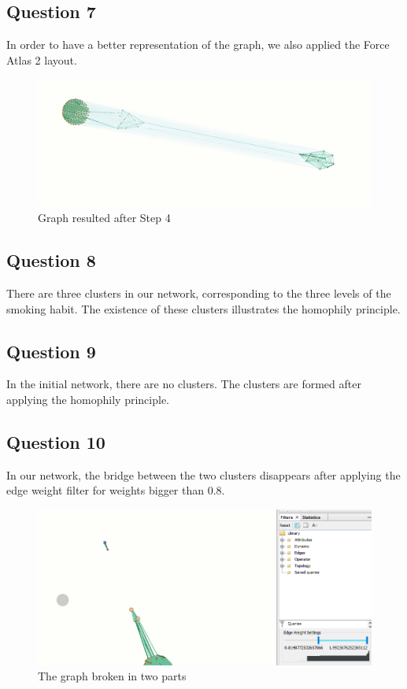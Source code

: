 \documentclass[a4paper]{article}
\begin{document}
\subsection{Question 7}

In order to have a better representation of the graph, we also applied the Force Atlas 2 layout.

\begin{figure}[H]
\centering
\includegraphics[width=\textwidth]{res/img/q17graph.png}
\caption{Graph resulted after Step 4}
\label{fig:network_output2}
\end{figure}

\subsection{Question 8}

There are three clusters in our network, corresponding to the three levels of the smoking habit. The existence of these clusters illustrates the homophily principle.

\subsection{Question 9}
In the initial network, there are no clusters. The clusters are formed after applying the homophily principle. 

\subsection{Question 10}

In our network, the bridge between the two clusters disappears after applying the edge weight filter for weights bigger than 0.8.

\begin{figure}[H]
\centering
\includegraphics[width=\textwidth]{res/img/bridge.png}
\caption{The graph broken in two parts}
\label{fig:network_output3}
\end{figure}
\end{document}
